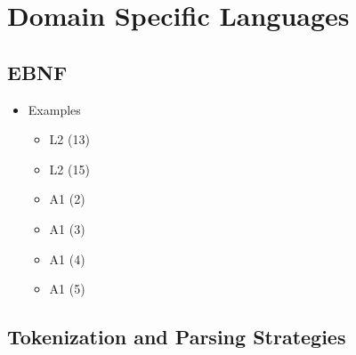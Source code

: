 \documentclass{article}
\begin{document}
\section{Domain Specific Languages}

\subsection{EBNF}

\begin{itemize}
    \item Examples
    \begin{itemize}
        \item L2 (13)
        \item L2 (15)
        \item A1 (2)
        \item A1 (3)
        \item A1 (4)
        \item A1 (5)
    \end{itemize}
\end{itemize}

\subsection{Tokenization and Parsing Strategies}
\end{document}
